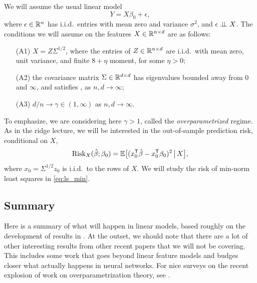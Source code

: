 \documentclass{article}
\begin{document}
We will assume the usual linear model 
\begin{equation}
\label{eq:model}
Y = X\beta_0 + \epsilon,
\end{equation}
where $\epsilon \in \mathbb{R}^n$ has i.i.d.\ entries with mean zero and variance
$\sigma^2$, and $\epsilon \perp\!\!\!\perp X$. The conditions we will assume on the
features $X \in \mathbb{R}^{n \times d}$ are as follows:
\begin{itemize}
\item[(A1)] $X = Z \Sigma^{1/2}$, where the entries of $Z \in \mathbb{R}^{n \times d}$
  are i.i.d.\ with mean zero, unit variance, and finite $8+\eta$ moment, for
  some $\eta>0$; 
\item[(A2)] the covariance matrix $\Sigma \in \mathbb{R}^{d \times d}$ has eigenvalues
  bounded away from $0$ and $\infty$, and satisfies ,
  as $n,d \to \infty$; 
\item[(A3)] $d/n \to \gamma \in (1,\infty)$ as $n,d \to \infty$.
\end{itemize}
To emphasize, we are considering here $\gamma > 1$, called the
\emph{overparametrized} regime. As in the ridge lecture, we will be interested
in the out-of-sample prediction risk, conditional on $X$, 
\begin{equation}
\label{eq:risk}
\mathrm{Risk}_X(\hat{\beta}; \beta_0) = \mathbb{E} \big[ ( x_0^{\mathsf{T}} \hat{\beta} - x_0^{\mathsf{T}} \beta_0 )^2
\,\big|\, X \big],
\end{equation}
where $x_0 = \Sigma^{1/2} z_0$ is i.i.d.\ to the rows of $X$. We will study the
risk of min-norm least squares in \eqref{eq:ls_min}. 

\subsection{Summary}

Here is a summary of what will happen in linear models, based roughly on the
development of results  in \citet{hastie2022surprises}. At the outset, we should
note that there are a lot of other interesting results from other recent papers
that we will not be covering. This includes some work that goes beyond linear
feature models and budges closer what actually happens in neural networks. For
nice surveys on the recent explosion of work on overparametrization theory, see 
\citet{bartlett2021deep, belkin2021fit, dar2021farewell}.      
\end{document}
